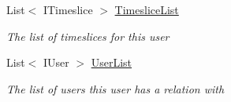 \begin{DoxyCompactItemize}
List$<$ I\+Timeslice $>$ \hyperlink{class_plex_byte_1_1_mo_cap_1_1_managers_1_1_object_manager_a7863fe2ccb2201bd237d3adc20102df3}{Timeslice\+List}
\begin{DoxyCompactList}\small\item\em The list of timeslices for this user \end{DoxyCompactList}\item 
List$<$ I\+User $>$ \hyperlink{class_plex_byte_1_1_mo_cap_1_1_managers_1_1_object_manager_a3e12ca329e7dfb12c4930edb85799529}{User\+List}
\begin{DoxyCompactList}\small\item\em The list of users this user has a relation with \end{DoxyCompactList}\end{DoxyCompactItemize}
